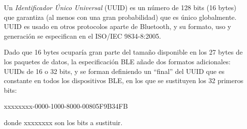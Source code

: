Un \textit{Identificador Único Universal} (UUID) es un número de 128 bits (16 bytes) que garantiza (al menos con una gran probabilidad) que es único globalmente. UUID es usado en otros protocolos aparte de Bluetooth, y su formato, uso y generación se especifican en el ISO/IEC 9834-8:2005.

Dado que 16 bytes ocuparía gran parte del tamaño disponible en los 27 bytes de los paquetes de datos, la especificación BLE añade dos formatos adicionales: UUIDs de 16 o 32 bits, y se forman definiendo un “final” del UUID que es constante en todos los dispositivos BLE, en los que se sustituyen los 32 primeros bits:

\begin{center}xxxxxxxx-0000-1000-8000-00805F9B34FB\end{center}

donde xxxxxxxx son los bits a sustituir.




